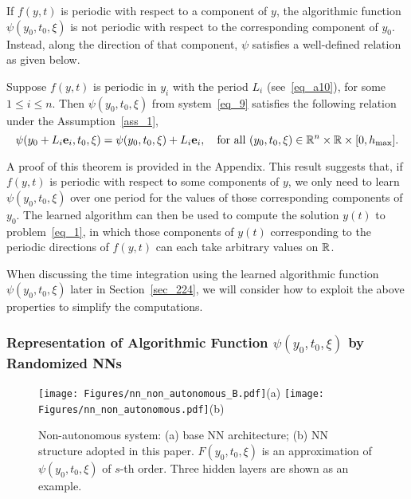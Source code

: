 If $f(y,t)$ is periodic with respect to a component
of $y$, the algorithmic function $\psi(y_0,t_0,\xi)$
is not periodic with respect to the corresponding component of $y_0$.
Instead, along the direction of that component, $\psi$
satisfies a well-defined relation as given below.
\begin{theorem}\label{thm_a2}
  Suppose $f(y,t)$ is periodic in $y_i$ with the period $L_i$ (see~\eqref{eq_a10}),
  for some $1\leqslant i\leqslant n$.
  Then $\psi(y_0,t_0,\xi)$ from system~\eqref{eq_9} satisfies
  the following relation under the Assumption~\ref{ass_1},
  \begin{equation}\label{eq_a11}
    \psi(y_0+L_i\mathbf{e}_i,t_0,\xi) = \psi(y_0,t_0,\xi) + L_i\mathbf{e}_i,
    \quad \text{for all}\ (y_0,t_0,\xi)\in\mathbb{R}^n\times \mathbb{R}\times[0,h_{\max}].
  \end{equation}
\end{theorem}
\noindent A proof of this theorem is provided in the Appendix.
This result suggests that, if $f(y,t)$ is periodic with respect to some components
of $y$, we only need to learn $\psi(y_0,t_0,\xi)$ over one period
for the values of those  corresponding components of $y_0$.
The learned algorithm can then be used to compute the solution $y(t)$
to problem~\eqref{eq_1}, in which those components of $y(t)$
corresponding to the periodic directions of $f(y,t)$ can each take
arbitrary values on $\mathbb{R}$.

When discussing the time integration using the learned
algorithmic function $\psi(y_0,t_0,\xi)$ later in Section~\ref{sec_224},
we will consider
how to exploit the above properties to simplify the computations.




\subsubsection{Representation of Algorithmic Function $\psi(y_0,t_0,\xi)$ by Randomized NNs}
\label{sec_221}


\begin{figure}
  \centerline{
    \texttt{[image: Figures/nn\_non\_autonomous\_B.pdf]}(a)
    \texttt{[image: Figures/nn\_non\_autonomous.pdf]}(b)
  }
  \caption{Non-autonomous system: (a) base NN architecture; (b)
    NN structure adopted in this paper.
    $F(y_0,t_0,\xi)$ is an approximation of $\psi(y_0,t_0,\xi)$ of $s$-th order.
    Three hidden layers are shown as an example.
  }
  \label{fg_1}
\end{figure}


